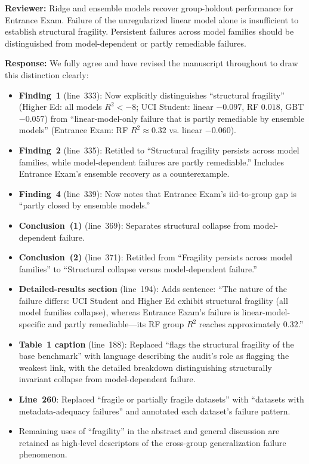 \documentclass[10pt,letterpaper]{article}
\begin{document}
\textbf{Reviewer:} Ridge and ensemble models recover group-holdout performance for Entrance Exam. Failure of the unregularized linear model alone is insufficient to establish structural fragility. Persistent failures across model families should be distinguished from model-dependent or partly remediable failures.

\textbf{Response:} We fully agree and have revised the manuscript throughout to draw this distinction clearly:

\begin{itemize}
  \item \textbf{Finding~1} (line~333): Now explicitly distinguishes ``structural fragility'' (Higher Ed: all models $R^2 < -8$; UCI Student: linear $-0.097$, RF $0.018$, GBT $-0.057$) from ``linear-model-only failure that is partly remediable by ensemble models'' (Entrance Exam: RF $R^2 \approx 0.32$ vs. linear $-0.060$).
  \item \textbf{Finding~2} (line~335): Retitled to ``Structural fragility persists across model families, while model-dependent failures are partly remediable.'' Includes Entrance Exam's ensemble recovery as a counterexample.
  \item \textbf{Finding~4} (line~339): Now notes that Entrance Exam's iid-to-group gap is ``partly closed by ensemble models.''
  \item \textbf{Conclusion~(1)} (line~369): Separates structural collapse from model-dependent failure.
  \item \textbf{Conclusion~(2)} (line~371): Retitled from ``Fragility persists across model families'' to ``Structural collapse versus model-dependent failure.''
  \item \textbf{Detailed-results section} (line~194): Adds sentence: ``The nature of the failure differs: UCI Student and Higher Ed exhibit structural fragility (all model families collapse), whereas Entrance Exam's failure is linear-model-specific and partly remediable---its RF group $R^2$ reaches approximately $0.32$.''
  \item \textbf{Table~1 caption} (line~188): Replaced ``flags the structural fragility of the base benchmark'' with language describing the audit's role as flagging the weakest link, with the detailed breakdown distinguishing structurally invariant collapse from model-dependent failure.
  \item \textbf{Line~260}: Replaced ``fragile or partially fragile datasets'' with ``datasets with metadata-adequacy failures'' and annotated each dataset's failure pattern.
  \item Remaining uses of ``fragility'' in the abstract and general discussion are retained as high-level descriptors of the cross-group generalization failure phenomenon.
\end{itemize}
\end{document}
